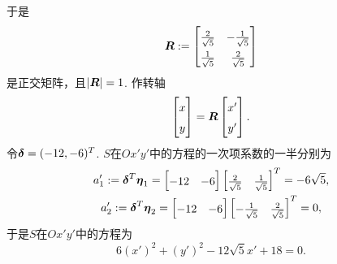 \begin{example}
\begin{solution}
于是\begin{equation*}
	\def\arraystretch{1.5}
	\vb{R} \defeq \begin{bmatrix}
		\frac2{\sqrt5} & -\frac1{\sqrt5} \\
		\frac1{\sqrt5} & \frac2{\sqrt5}
	\end{bmatrix}
\end{equation*}
是正交矩阵，且\(\abs{\boldsymbol{R}} = 1\).
作转轴\begin{equation*}
	\begin{bmatrix}
		x \\ y
	\end{bmatrix}
	= \vb{R}
	\begin{bmatrix}
		x' \\ y'
	\end{bmatrix}.
\end{equation*}
令\(\boldsymbol\delta = (-12,-6)^T\).
\(S\)在\(Ox'y'\)中的方程的一次项系数的一半分别为\begin{gather*}
	a'_1 \defeq \vb\delta^T \vb\eta_1
	= \begin{bmatrix}
		-12 & -6
	\end{bmatrix}
	\begin{bmatrix}
		\frac2{\sqrt5} & \frac1{\sqrt5}
	\end{bmatrix}^T
	= -6\sqrt5, \\
	a'_2 \defeq \vb\delta^T \vb\eta_2
	= \begin{bmatrix}
		-12 & -6
	\end{bmatrix}
	\begin{bmatrix}
		-\frac1{\sqrt5} & \frac2{\sqrt5}
	\end{bmatrix}^T
	= 0,
\end{gather*}
于是\(S\)在\(Ox'y'\)中的方程为\begin{equation*}
	6(x')^2 + (y')^2 - 12\sqrt5 x' + 18 = 0.
\end{equation*}
\end{solution}
\end{example}

